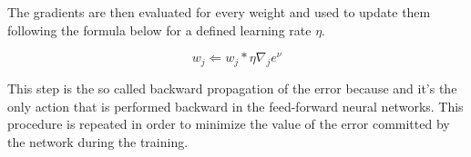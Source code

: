 The gradients are then evaluated for every weight and used to update them following the formula below for a defined
learning rate $\eta$.

\begin{equation} \label{eq:weights-update}
    w_j \Leftarrow w_j * \eta \nabla_j e^\nu
\end{equation}

This step is the so called backward propagation of the error because and it's the only action that is
performed backward in the feed-forward neural networks. This procedure is repeated in order to minimize
the value of the error committed by the network during the training.